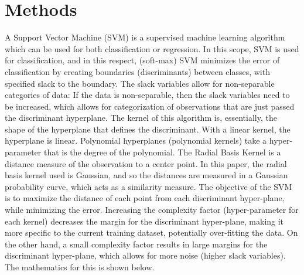 \documentclass[tikz]{article}
\begin{document}
\section{Methods}
\label{sec:methods}
A Support Vector Machine (SVM) is a supervised machine learning algorithm which can be used for both classification or regression. In this scope, SVM is used for classification, and in this respect, (soft-max) SVM minimizes the error of classification by creating boundaries (discriminants) between classes, with specified slack to the boundary. The slack variables allow for non-separable categories of data: If the data is non-separable, then the slack variables need to be increased, which allows for categorization of observations that are just passed the discriminant hyperplane. The kernel of this algorithm is, essentially, the shape of the hyperplane that defines the discriminant. With a linear kernel, the hyperplane is linear. Polynomial hyperplanes (polynomial kernels) take a hyper-parameter that is the degree of the polynomial. The Radial Basis Kernel is a distance measure of the observation to a center point. In this paper, the radial basis kernel used is Gaussian, and so the distances are measured in a Gaussian probability curve, which acts as a similarity measure. The objective of the SVM is to maximize the distance of each point from each discriminant hyper-plane, while minimizing the error. Increasing the complexity factor (hyper-parameter for each kernel) decreases the margin for the discriminant hyper-plane, making it more specific to the current training dataset, potentially over-fitting the data. On the other hand, a small complexity factor results in large margins for the discriminant hyper-plane, which allows for more noise (higher slack variables). The mathematics for this is shown below.
\end{document}

